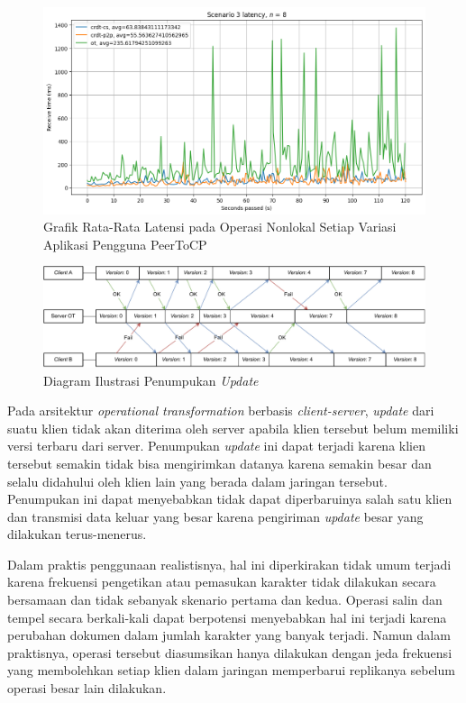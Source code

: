 \begin{figure}
 \centering
 \includegraphics[width=15cm]{./assets/skripsi/benchmark-vis_cell_7_output_5}
 \caption{Grafik Rata-Rata Latensi pada Operasi Nonlokal Setiap Variasi Aplikasi Pengguna PeerToCP}
 \label{fig:7-5}
\end{figure}

\begin{figure}
 \centering
 \includegraphics[width=15cm]{./assets/skripsi/Snowball}
 \caption{Diagram Ilustrasi Penumpukan \textit{Update}}
 \label{diagram:snowball}
\end{figure}

Pada arsitektur \textit{operational transformation} berbasis \textit{client-server}, \textit{update} dari suatu klien tidak akan diterima oleh server apabila klien tersebut belum memiliki versi terbaru dari server. Penumpukan \textit{update} ini dapat terjadi karena klien tersebut semakin tidak bisa mengirimkan datanya karena semakin besar dan selalu didahului oleh klien lain yang berada dalam jaringan tersebut. Penumpukan ini dapat menyebabkan tidak dapat diperbaruinya salah satu klien dan transmisi data keluar yang besar karena pengiriman \textit{update} besar yang dilakukan terus-menerus.

Dalam praktis penggunaan realistisnya, hal ini diperkirakan tidak umum terjadi karena frekuensi pengetikan atau pemasukan karakter tidak dilakukan secara bersamaan dan tidak sebanyak skenario pertama dan kedua. Operasi salin dan tempel secara berkali-kali dapat berpotensi menyebabkan hal ini terjadi karena perubahan dokumen dalam jumlah karakter yang banyak terjadi. Namun dalam praktisnya, operasi tersebut diasumsikan hanya dilakukan dengan jeda frekuensi yang membolehkan setiap klien dalam jaringan memperbarui replikanya sebelum operasi besar lain dilakukan.

